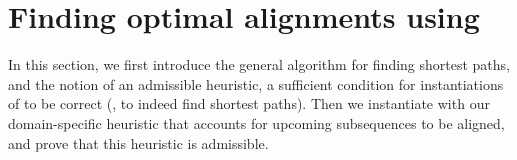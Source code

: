 \section{Finding optimal alignments using \A} \label{TRIEsec:astarix-algo}

In this section, we first introduce the general \A algorithm for finding
shortest paths, and the notion of an admissible heuristic, a sufficient
condition for instantiations of \A to be correct (\ie, to indeed find shortest
paths). Then we instantiate \A with our domain-specific heuristic that accounts
for upcoming subsequences to be aligned, and prove that this heuristic is
admissible.




